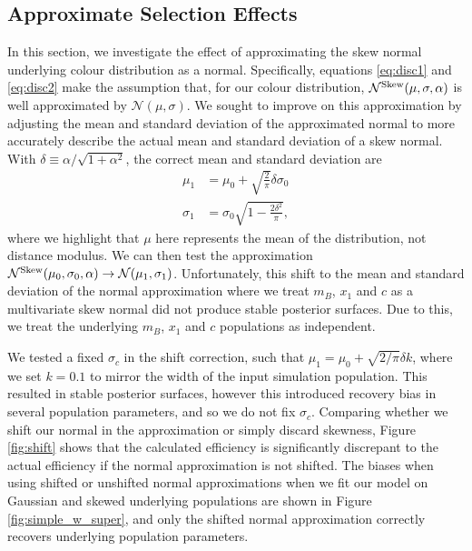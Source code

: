 \documentclass[a4paper,fleqn,usenatbib]{mnras}
\begin{document}
\subsection{Approximate Selection Effects}
\label{app:approx}

In this section, we investigate the effect of approximating the skew normal underlying colour distribution as a normal. Specifically, equations \eqref{eq:disc1} and \eqref{eq:disc2} make the assumption that, for our colour distribution, $\mathcal{N}^{\rm Skew}(\mu, \sigma, \alpha)$ is well approximated by $\mathcal{N}(\mu, \sigma)$. We sought to improve on this approximation by adjusting the mean and standard deviation of the approximated normal to more accurately describe the actual mean and standard deviation of a skew normal. With $\delta \equiv \alpha/\sqrt{1+\alpha^2}$, the correct mean and standard deviation are
\begin{align}
\mu_1 &= \mu_0 + \sqrt{\frac{2}{\pi}} \delta \sigma_0 \\
\sigma_1 &= \sigma_0 \sqrt{1 - \frac{2 \delta^2}{\pi}},
\end{align}
where we highlight that $\mu$ here represents the mean of the distribution, not distance modulus. We can then test the approximation $\mathcal{N}^{\rm Skew}(\mu_0, \sigma_0, \alpha) \rightarrow \mathcal{N}(\mu_1, \sigma_1)$. Unfortunately, this shift to the mean and standard deviation of the normal approximation where we treat $m_B$, $x_1$ and $c$ as a multivariate skew normal did not produce stable posterior surfaces. Due to this, we treat the underlying $m_B$, $x_1$ and $c$ populations as independent. 

We tested a fixed $\sigma_c$ in the shift correction, such that $\mu_1 = \mu_0 + \sqrt{2/\pi}\delta k$, where we set $k=0.1$ to mirror the width of the input simulation population. This resulted in stable posterior surfaces, however this introduced recovery bias in several population parameters, and so we do not fix $\sigma_c$. Comparing whether we shift our normal in the approximation or simply discard skewness, Figure \ref{fig:shift} shows that the calculated efficiency is significantly discrepant to the actual efficiency if the normal approximation is not shifted. The biases when using shifted or unshifted normal approximations when we fit our model on Gaussian and skewed underlying populations are shown in Figure \ref{fig:simple_w_super}, and only the shifted normal approximation correctly recovers underlying population parameters.
\end{document}
